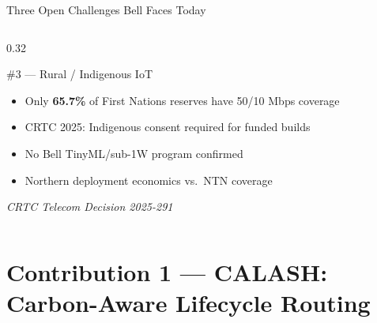\documentclass[aspectratio=169, 11pt]{beamer}
\begin{document}
\begin{frame}{Three Open Challenges Bell Faces Today}
\begin{columns}[T]
\begin{column}{0.32\textwidth}
  \begin{exampleblock}{\#3 — Rural / Indigenous IoT}
    \vspace{2pt}
    \begin{itemize}\setlength{\itemsep}{2pt}
      \item[\textbullet] Only \textbf{65.7\%} of First Nations reserves have 50/10 Mbps coverage
      \item[\textbullet] CRTC 2025: Indigenous consent required for funded builds
      \item[\textbullet] No Bell TinyML/sub-1W program confirmed
      \item[\textbullet] Northern deployment economics vs.\ NTN coverage
    \end{itemize}
    \vspace{2pt}
    {\scriptsize\textit{CRTC Telecom Decision 2025-291}}
  \end{exampleblock}
\end{column}

\end{columns}

\vspace{4pt}
\centering
{}

\end{frame}

\section{Contribution 1 — CALASH: Carbon-Aware Lifecycle Routing}
\end{document}
